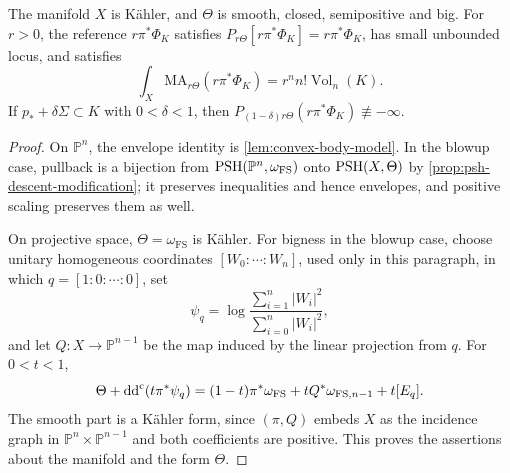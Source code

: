 \begin{lemma}\label{lem:convex-body-mass}
The manifold $X$ is K\"ahler, and $\Theta$ is smooth, closed, semipositive and big. For $r>0$, the reference $r\pi^*\Phi_K$ satisfies $P_{r\Theta}[r\pi^*\Phi_K]=r\pi^*\Phi_K$, has small unbounded locus, and satisfies
\begin{equation}\label{eq:convex-body-mass}
 \int_X\mathrm{MA}_{r\Theta}(r\pi^*\Phi_K)
       =r^n n!\operatorname{Vol}_n(K).
\end{equation}
If $p_*+\delta\Sigma\subset K$ with $0<\delta<1$, then $P_{(1-\delta)r\Theta}(r\pi^*\Phi_K)\not\equiv-\infty$.
\end{lemma}
\begin{proof}
On $\mathbb P^n$, the envelope identity is \cref{lem:convex-body-model}. In the blowup case, pullback is a bijection from $\mathrm{PSH}(\mathbb P^n,\omega_{\mathrm{FS}})$ onto $\mathrm{PSH}(X,\Theta)$ by \cref{prop:psh-descent-modification}; it preserves inequalities and hence envelopes, and positive scaling preserves them as well.

On projective space, $\Theta=\omega_{\mathrm{FS}}$ is K\"ahler. For bigness in the blowup case, choose unitary homogeneous coordinates $[W_0:\cdots:W_n]$, used only in this paragraph, in which $q=[1:0:\cdots:0]$, set
\[
 \psi_q=\log\frac{\sum_{i=1}^n|W_i|^2}{\sum_{i=0}^n|W_i|^2},
\]
and let $Q\colon X\to\mathbb P^{n-1}$ be the map induced by the linear projection from $q$. For $0<t<1$,
\[
 \Theta+\mathrm{dd}^{\mathrm{c}}(t\pi^*\psi_q)
 =(1-t)\pi^*\omega_{\mathrm{FS}}+tQ^*\omega_{\mathrm{FS},n-1}+t[E_q].
\]
The smooth part is a K\"ahler form, since $(\pi,Q)$ embeds $X$ as the incidence graph in $\mathbb P^n\times\mathbb P^{n-1}$ and both coefficients are positive. This proves the assertions about the manifold and the form $\Theta$.


\end{proof}
